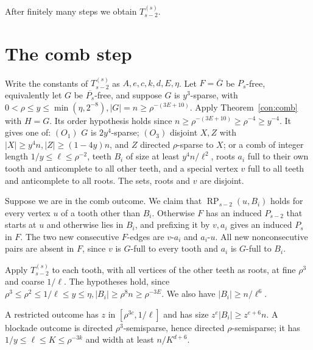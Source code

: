 \documentclass[11pt,a4paper]{article}
\theoremstyle{definition}
\theoremstyle{remark}
\numberwithin{equation}{section}
\DeclareMathOperator{\RP}{RP}
\begin{document}
After finitely many steps we obtain \(T_{s-2}^{(s)}\).


\section{The comb step}\label{sec:comb}
Write the constants of \(T_{s-2}^{(s)}\) as \(A,\allowbreak e,\allowbreak c,\allowbreak k,\allowbreak d,\allowbreak E,\allowbreak \eta\). Let \(F=\overline G\) be \(P_s\)-free, equivalently let \(G\) be \(\overline{P_s}\)-free, and suppose \(G\) is \(y^3\)-sparse, with \(0<\rho\le\allowbreak y\le\allowbreak \min (\eta,\allowbreak 2^{-8}),\allowbreak  |G|=n\ge\allowbreak \rho^{-(3E+10)}\).
Apply Theorem~\ref{con:comb} with \(H=G\). Its order hypothesis holds since
\(n\ge\rho^{-(3E+10)}\ge\rho^{-4}\ge y^{-4}\). It gives one of:
\((O_{1})\) \(G\) is \(2y^{4}\)-sparse; \((O_{3})\) disjoint \(X,\allowbreak Z\) with \(|X|\ge\allowbreak y^{4}n,\allowbreak  |Z|\ge\allowbreak (1-4y)n\), and \(Z\) directed \(\rho\)-sparse to \(X\); or a comb of integer length \(1/y\le\allowbreak \ell\le\allowbreak \rho^{-2}\), teeth \(B_{i}\) of size at least \(y^{4}n/\ell^{2}\), roots \(a_{i}\) full to their own tooth and anticomplete to all other teeth, and a special vertex \(v\) full to all teeth and anticomplete to all roots. The sets, roots and \(v\) are disjoint.

Suppose we are in the comb outcome. We claim that \(\RP_{s-2}(u,B_i)\) holds for every vertex \(u\) of a tooth other than \(B_i\). Otherwise \(F\) has an induced \(P_{s-2}\) that starts at \(u\) and otherwise lies in \(B_{i}\), and prefixing it by \(v,a_{i}\) gives an induced \(P_{s}\) in \(F\). The two new consecutive \(F\)-edges are \(v\text{-}a_{i}\) and \(a_{i}\text{-}u\). All new nonconsecutive pairs are absent in \(F\), since \(v\) is \(G\)-full to every tooth and \(a_{i}\) is \(G\)-full to \(B_{i}\).

Apply \(T_{s-2}^{(s)}\) to each tooth, with all vertices of the other teeth as roots, at fine \(\rho^{3}\) and coarse \(1/\ell\). The hypotheses hold, since \(\rho^{3}\le\allowbreak \rho^{2}\le\allowbreak 1/\ell\le\allowbreak y\le\allowbreak \eta,\allowbreak  |B_{i}|\ge\allowbreak \rho^{8} n\ge\allowbreak \rho^{-3E}\). We also have \(|B_{i}|\ge\allowbreak n/\ell^{6}\).

A restricted outcome has \(z\) in \([\rho^{3c},\allowbreak 1/\ell]\) and has size \(z^{e} |B_{i}|\ge\allowbreak z^{e+6}n\). A blockade outcome is directed \(\rho^{3}\)-semisparse, hence directed \(\rho\)-semisparse; it has \(1/y\le\allowbreak \ell\le\allowbreak K\le\allowbreak \rho^{-3k}\) and width at least \(n/K^{d+6}\).
\end{document}
